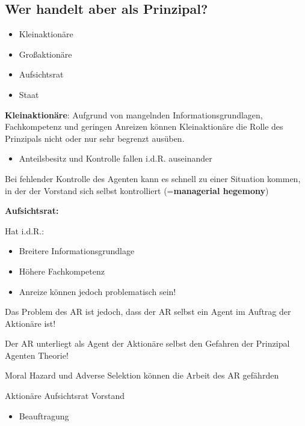 \documentclass[
]{article}
\providecommand{\tightlist}{%
  \setlength{\itemsep}{0pt}\setlength{\parskip}{0pt}}
\begin{document}
\hypertarget{wer-handelt-aber-als-prinzipal}{%
\subsection{Wer handelt aber als
Prinzipal?}\label{wer-handelt-aber-als-prinzipal}}

\begin{itemize}
\tightlist
\item
  Kleinaktionäre
\item
  Großaktionäre
\item
  Aufsichtsrat
\item
  Staat
\end{itemize}

\textbf{Kleinaktionäre}: Aufgrund von mangelnden Informationsgrundlagen,
Fachkompetenz und geringen Anreizen können Kleinaktionäre die Rolle des
Prinzipals nicht oder nur sehr begrenzt ausüben.

\begin{itemize}
\tightlist
\item
  Anteilsbesitz und Kontrolle fallen i.d.R. auseinander
\end{itemize}

Bei fehlender Kontrolle des Agenten kann es schnell zu einer Situation
kommen, in der der Vorstand sich selbst kontrolliert
(=\textbf{managerial hegemony})

\textbf{Aufsichtsrat:}

Hat i.d.R.:

\begin{itemize}
\tightlist
\item
  Breitere Informationsgrundlage
\item
  Höhere Fachkompetenz
\item
  Anreize können jedoch problematisch sein!
\end{itemize}

Das Problem des AR ist jedoch, dass der AR selbst ein Agent im Auftrag
der Aktionäre ist!

Der AR unterliegt als Agent der Aktionäre selbst den Gefahren der
Prinzipal Agenten Theorie!

Moral Hazard und Adverse Selektion können die Arbeit des AR gefährden

Aktionäre Aufsichtsrat Vorstand

\begin{itemize}
\tightlist
\item
  Beauftragung
\end{itemize}
\end{document}
